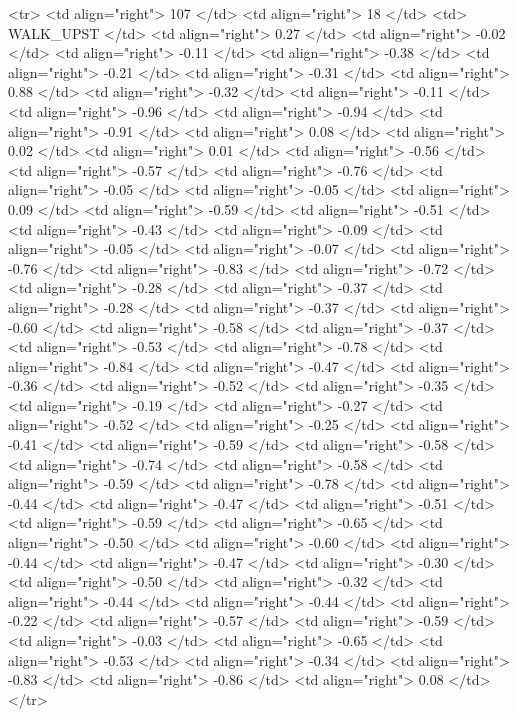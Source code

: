   <tr> <td align="right"> 107 </td> <td align="right">  18 </td> <td> WALK_UPST </td> <td align="right"> 0.27 </td> <td align="right"> -0.02 </td> <td align="right"> -0.11 </td> <td align="right"> -0.38 </td> <td align="right"> -0.21 </td> <td align="right"> -0.31 </td> <td align="right"> 0.88 </td> <td align="right"> -0.32 </td> <td align="right"> -0.11 </td> <td align="right"> -0.96 </td> <td align="right"> -0.94 </td> <td align="right"> -0.91 </td> <td align="right"> 0.08 </td> <td align="right"> 0.02 </td> <td align="right"> 0.01 </td> <td align="right"> -0.56 </td> <td align="right"> -0.57 </td> <td align="right"> -0.76 </td> <td align="right"> -0.05 </td> <td align="right"> -0.05 </td> <td align="right"> 0.09 </td> <td align="right"> -0.59 </td> <td align="right"> -0.51 </td> <td align="right"> -0.43 </td> <td align="right"> -0.09 </td> <td align="right"> -0.05 </td> <td align="right"> -0.07 </td> <td align="right"> -0.76 </td> <td align="right"> -0.83 </td> <td align="right"> -0.72 </td> <td align="right"> -0.28 </td> <td align="right"> -0.37 </td> <td align="right"> -0.28 </td> <td align="right"> -0.37 </td> <td align="right"> -0.60 </td> <td align="right"> -0.58 </td> <td align="right"> -0.37 </td> <td align="right"> -0.53 </td> <td align="right"> -0.78 </td> <td align="right"> -0.84 </td> <td align="right"> -0.47 </td> <td align="right"> -0.36 </td> <td align="right"> -0.52 </td> <td align="right"> -0.35 </td> <td align="right"> -0.19 </td> <td align="right"> -0.27 </td> <td align="right"> -0.52 </td> <td align="right"> -0.25 </td> <td align="right"> -0.41 </td> <td align="right"> -0.59 </td> <td align="right"> -0.58 </td> <td align="right"> -0.74 </td> <td align="right"> -0.58 </td> <td align="right"> -0.59 </td> <td align="right"> -0.78 </td> <td align="right"> -0.44 </td> <td align="right"> -0.47 </td> <td align="right"> -0.51 </td> <td align="right"> -0.59 </td> <td align="right"> -0.65 </td> <td align="right"> -0.50 </td> <td align="right"> -0.60 </td> <td align="right"> -0.44 </td> <td align="right"> -0.47 </td> <td align="right"> -0.30 </td> <td align="right"> -0.50 </td> <td align="right"> -0.32 </td> <td align="right"> -0.44 </td> <td align="right"> -0.44 </td> <td align="right"> -0.22 </td> <td align="right"> -0.57 </td> <td align="right"> -0.59 </td> <td align="right"> -0.03 </td> <td align="right"> -0.65 </td> <td align="right"> -0.53 </td> <td align="right"> -0.34 </td> <td align="right"> -0.83 </td> <td align="right"> -0.86 </td> <td align="right"> 0.08 </td> </tr>

